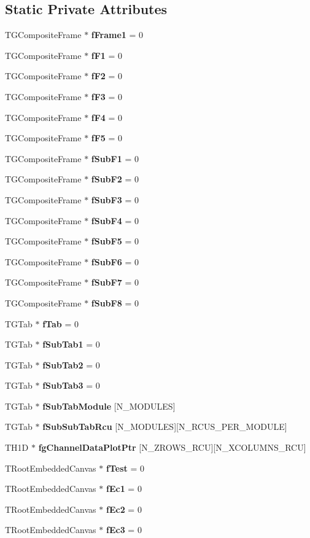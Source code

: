 \subsection*{Static Private Attributes}
\begin{CompactItemize}
\item 
TGComposite\-Frame $\ast$ {\bf f\-Frame1} = 0
\item 
TGComposite\-Frame $\ast$ {\bf f\-F1} = 0
\item 
TGComposite\-Frame $\ast$ {\bf f\-F2} = 0
\item 
TGComposite\-Frame $\ast$ {\bf f\-F3} = 0
\item 
TGComposite\-Frame $\ast$ {\bf f\-F4} = 0
\item 
TGComposite\-Frame $\ast$ {\bf f\-F5} = 0
\item 
TGComposite\-Frame $\ast$ {\bf f\-Sub\-F1} = 0
\item 
TGComposite\-Frame $\ast$ {\bf f\-Sub\-F2} = 0
\item 
TGComposite\-Frame $\ast$ {\bf f\-Sub\-F3} = 0
\item 
TGComposite\-Frame $\ast$ {\bf f\-Sub\-F4} = 0
\item 
TGComposite\-Frame $\ast$ {\bf f\-Sub\-F5} = 0
\item 
TGComposite\-Frame $\ast$ {\bf f\-Sub\-F6} = 0
\item 
TGComposite\-Frame $\ast$ {\bf f\-Sub\-F7} = 0
\item 
TGComposite\-Frame $\ast$ {\bf f\-Sub\-F8} = 0
\item 
TGTab $\ast$ {\bf f\-Tab} = 0
\item 
TGTab $\ast$ {\bf f\-Sub\-Tab1} = 0
\item 
TGTab $\ast$ {\bf f\-Sub\-Tab2} = 0
\item 
TGTab $\ast$ {\bf f\-Sub\-Tab3} = 0
\item 
TGTab $\ast$ {\bf f\-Sub\-Tab\-Module} [N\_\-MODULES]
\item 
TGTab $\ast$ {\bf f\-Sub\-Sub\-Tab\-Rcu} [N\_\-MODULES][N\_\-RCUS\_\-PER\_\-MODULE]
\item 
TH1D $\ast$ {\bf fg\-Channel\-Data\-Plot\-Ptr} [N\_\-ZROWS\_\-RCU][N\_\-XCOLUMNS\_\-RCU]
\item 
TRoot\-Embedded\-Canvas $\ast$ {\bf f\-Test} = 0
\item 
TRoot\-Embedded\-Canvas $\ast$ {\bf f\-Ec1} = 0
\item 
TRoot\-Embedded\-Canvas $\ast$ {\bf f\-Ec2} = 0
\item 
TRoot\-Embedded\-Canvas $\ast$ {\bf f\-Ec3} = 0

\end{CompactItemize}

